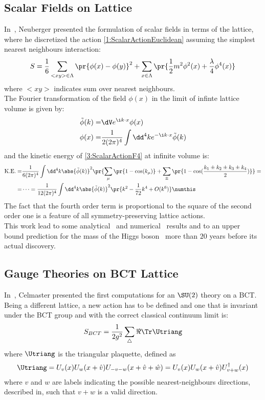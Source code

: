 \subsection{Scalar Fields on \spFtext Lattice}
In~\cite{Neuberger:1987kt}, Neuberger presented the formulation of scalar fields in terms of the \spFtext lattice, where he discretized the action \eqref{1:ScalarActionEuclidean} assuming the simplest nearest neighbours interaction:
\begin{equation}
    S = \frac16\sum_{<xy>\in\Lambda}\pr{\phi(x)-\phi(y)}^2 +\sum_{x\in\Lambda}\pr{\frac12m^2\phi^2(x)+\frac\lambda4\phi^4(x)} \label{3:ScalarActionF4}
\end{equation}
where $<xy>$ indicates sum over nearest neighbours.\\
The Fourier transformation of the field $\phi(x)$ in the limit of infinte lattice volume is given by:
\begin{align*}
    \tilde\phi(k) =& \dV e^{\i k \cdot x} \phi(x) \\
    \phi(x) =& \frac1{2(2\pi)^4} \int\dd^4k e^{-\i k \cdot x} \tilde\phi(k)
\end{align*}
and the kinetic energy of \eqref{3:ScalarActionF4} at infinite volume is:
\begin{align*}
    \text{K.E.} =& \frac1{6(2\pi)^4} \int\dd^4k \abs{\tilde\phi(k)}^2\pr{\sum_\mu\pr{1-\cos(k_\mu)} +\sum_\pm\pr{1-\cos(\frac{k_1\pm k_2\pm k_3\pm k_4}{2})}} =\\
    =& \dots = \frac{1}{12(2\pi)^4} \int\dd^4k \abs{\tilde\phi(k)}^2\pr{k^2-\frac{1}{72}k^4+O(k^6)} \numthis\label{3:ScalarKE}
\end{align*}
The fact that the fourth order term is proportional to the square of the second order one is a feature of all symmetry-preserving lattice actions.\\
This work lead to some analytical~\cite{Bhanot:1990zd} and numerical~\cite{Bhanot:1990ai} results and to an upper bound prediction for the mass of the Higgs boson~\cite{Heller:1990sg} more than $20$ years before its actual discovery.

\subsection{Gauge Theories on BCT Lattice}
In~\cite{Celmaster:1982ht}, Celmaster presented the first computations for an $\SU(2)$ theory on a BCT.
Being a different lattice, a new action has to be defined and one that is invariant under the BCT group and with the correct classical continuum limit is:
\begin{equation}
    S_{BCT} = \frac1{2g^2} \sum_\bigtriangleup \Re\Tr \Utriang \label{3:BCTAction}
\end{equation}
where $\Utriang$ is the triangular plaquette, defined as
\begin{equation}
    \Utriang = U_v(x)U_w(x+\hat{v})U_{-v-w}(x+\hat{v}+\hat{w}) = U_v(x)U_w(x+\hat{v})U^\dagger_{v+w}(x) \label{3:PlaqTriang}
\end{equation}
where $v$ and $w$ are labels indicating the possible nearest-neighbours directions, described in, such that $v+w$ is a valid direction.
